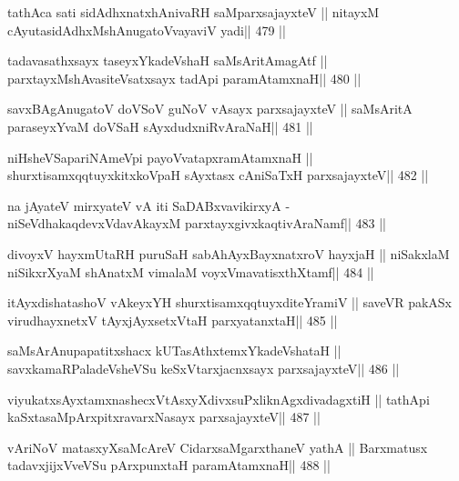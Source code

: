 \begin{shl}
tathAca sati sidAdhxnatxhAnivaRH saMparxsajayxteV ||
nitayxM cAyutasidAdhxMshAnugatoV\s vayaviV yadi\hfill || 479 ||
\end{shl}

\begin{shl}
tadavasathxsayx taseyxYkadeVshaH saMsAritAmagAtf ||
parxtayxMshAvasiteVsatxsayx tadA\s pi paramAtamxnaH\hfill || 480 ||
\end{shl}

\begin{shl}
savxBAgAnugatoV doVSoV guNoV vA\s sayx parxsajayxteV ||
saMsAritA paraseyxYvaM doVSaH sAyxdudxniRvAraNaH\hfill || 481 ||
\end{shl}

\begin{shl}
niHsheVSapariNAmeV\s pi payoVvatapxramAtamxnaH ||
shurxtisamxqqtuyxkitxkoVpaH sAyxtasx cAniSaTxH parxsajayxteV\hfill || 482 ||
\end{shl}

\begin{shl}
na jAyateV mirxyateV vA iti SaDABxvavikirxyA -
niSeVdhakaqdevxVdavAkayxM parxtayxgivxkaqtivAraNamf\hfill || 483 ||
\end{shl}

\begin{shl}
divoyxV hayxmUtaRH puruSaH sabAhAyxBayxnatxroV hayxjaH ||
niSakxlaM niSikxrXyaM shAnatxM vimalaM voyxVmavatisxthXtamf\hfill || 484 ||
\end{shl}

\begin{shl}
itAyxdishatashoV vAkeyxYH shurxtisamxqqtuyxditeYramiV ||
saveVR pakASx virudhayxnetxV tAyxjAyxsetxV\s taH parxyatanxtaH\hfill || 485 ||
\end{shl}

\begin{shl}
saMsArAnupapatitxshacx kUTasAthxtemxYkadeVshataH ||
savxkamaRPaladeVsheVSu keSxVtarxjacnxsayx parxsajayxteV\hfill || 486 ||
\end{shl}

\begin{shl}
viyukatxsAyx\s\s tamxnashecxVtAsxyXdivxsuPxliknAgxdivadagxtiH ||
tathA\s pi kaSxtasaMpArxpitxravarxNasayx parxsajayxteV\hfill || 487 ||
\end{shl}

\begin{shl}
vAriNoV matasxyXsaMcAreV CidarxsaMgarxthaneV yathA ||
Barxmatusx tadavxjijxVveVSu pArxpunxtaH paramAtamxnaH\hfill || 488 ||
\end{shl}

